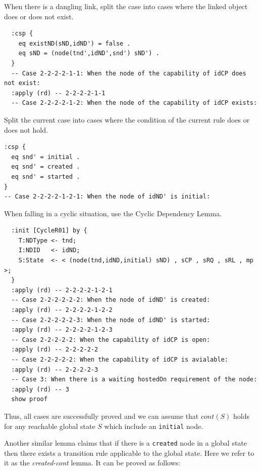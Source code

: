 \documentclass[12pt]{report}
\begin{document}
 When there is a dangling link, split the case
into cases where the linked object does or does not exist.
\small
\begin{verbatim}
  :csp {
    eq existND(sND,idND') = false .
    eq sND = (node(tnd',idND',snd') sND') .
  }
  -- Case 2-2-2-2-1-1: When the node of the capability of idCP does not exist:
  :apply (rd) -- 2-2-2-2-1-1
  -- Case 2-2-2-2-1-2: When the node of the capability of idCP exists:
\end{verbatim}
\normalsize
 Split the current case into cases where
the condition of the current rule does or does not hold.
\small
\begin{verbatim}
:csp {
  eq snd' = initial .
  eq snd' = created .
  eq snd' = started .
}
-- Case 2-2-2-2-1-2-1: When the node of idND' is initial:
\end{verbatim}
\normalsize
 When falling in a cyclic situation, use the
Cyclic Dependency Lemma. 
\small
\begin{verbatim}
  :init [CycleR01] by {
    T:NDType <- tnd;
    I:NDID   <- idND;
    S:State  <- < (node(tnd,idND,initial) sND) , sCP , sRQ , sRL , mp >;
  }
  :apply (rd) -- 2-2-2-2-1-2-1
  -- Case 2-2-2-2-2-2: When the node of idND' is created:
  :apply (rd) -- 2-2-2-2-1-2-2
  -- Case 2-2-2-2-2-3: When the node of idND' is started:
  :apply (rd) -- 2-2-2-2-1-2-3
  -- Case 2-2-2-2-2: When the capability of idCP is open:
  :apply (rd) -- 2-2-2-2-2
  -- Case 2-2-2-2-2: When the capability of idCP is avialable:
  :apply (rd) -- 2-2-2-2-3
  -- Case 3: When there is a waiting hostedOn requirement of the node:
  :apply (rd) -- 3
  show proof
\end{verbatim}
\normalsize
Thus, all cases are successfully proved and we can assume that $cont(S)$
holds for any reachable global state $S$ which include an {\tt initial} node.

Another similar lemma claims that if there is a {\tt created} node in
a global state then there exists a transition rule applicable to the
global state. Here we refer to it as the {\it created-cont} lemma. It
can be proved as follows:\\
\end{document}
